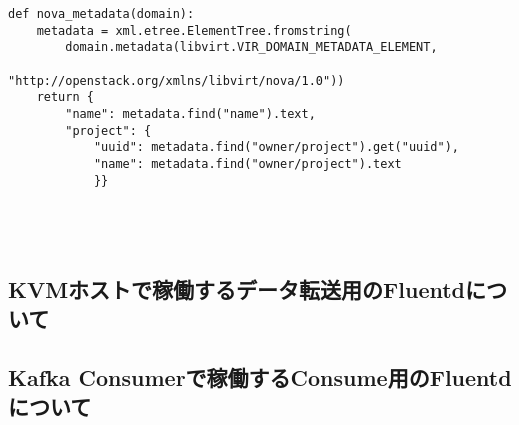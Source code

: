\begin{lstlisting}
def nova_metadata(domain):
    metadata = xml.etree.ElementTree.fromstring(
        domain.metadata(libvirt.VIR_DOMAIN_METADATA_ELEMENT,
                        "http://openstack.org/xmlns/libvirt/nova/1.0"))
    return {
        "name": metadata.find("name").text,
        "project": {
            "uuid": metadata.find("owner/project").get("uuid"),
            "name": metadata.find("owner/project").text
            }}
\end{lstlisting}

\begin{lstlisting}
\end{lstlisting}

\begin{lstlisting}
\end{lstlisting}

\begin{lstlisting}
\end{lstlisting}

\begin{lstlisting}
\end{lstlisting}

\subsection{KVMホストで稼働するデータ転送用のFluentdについて}

\subsection{Kafka Consumerで稼働するConsume用のFluentdについて}



